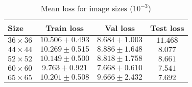 \documentclass[conference,compsoc]{IEEEtran}
\begin{document}


{\footnotesize
\begin{table}[t]
  \centering
  \caption{Mean loss for image sizes ($10^{-3}$)}
  \label{table:size_lightcurve}
  \begin{tabular}{|l||c|c|c|} \hline
    Size          & Train loss       & Val loss          & Test loss \\ \hline \hline
    $36\times 36$ & $10.506\pm 0.493$ & $8.684\pm 1.003$ & $11.468$  \\ \hline
    $44\times 44$ & $10.269\pm 0.515$ & $8.886\pm 1.648$ & $ 8.077$  \\ \hline
    $52\times 52$ & $10.149\pm 0.500$ & $8.818\pm 1.758$ & $ 8.661$  \\ \hline
    $60\times 60$ & $ 9.763\pm 0.921$ & $7.668\pm 0.610$ & $ 7.541$  \\ \hline
    $65\times 65$ & $10.201\pm 0.508$ & $9.666\pm 2.432$ & $ 7.692$  \\ \hline
  \end{tabular}
\end{table}
}
\end{document}
